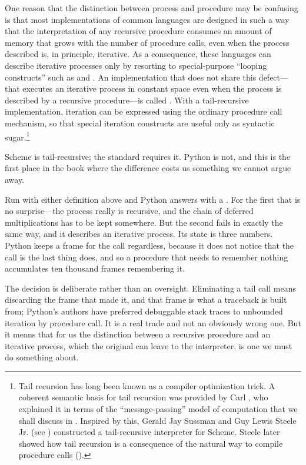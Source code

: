 One reason that the distinction between process and procedure may be confusing
is that most implementations of common languages are designed in such a way
that the interpretation of any recursive procedure consumes an amount of memory
that grows with the number of procedure calls, even when the process described
is, in principle, iterative.  As a consequence, these languages can describe
iterative processes only by resorting to special-purpose ``looping constructs''
such as  and .  An implementation that does not share
this defect---that executes an iterative process in constant space even when
the process is described by a recursive procedure---is called
.  With a tail-recursive implementation, iteration can
be expressed using the ordinary procedure call mechanism, so that special
iteration constructs are useful only as syntactic sugar.\footnote{Tail
recursion has long been known as a compiler optimization trick.  A coherent
semantic basis for tail recursion was provided by Carl ,
who explained it in terms of the ``message-passing'' model of computation that
we shall discuss in .  Inspired by this, Gerald Jay Sussman and
Guy Lewis Steele Jr. (see ) constructed a
tail-recursive interpreter for Scheme.  Steele later showed how tail recursion
is a consequence of the natural way to compile procedure calls
().}

\begin{departure}
Scheme is tail-recursive; the standard requires it.  Python is not, and this is
the first place in the book where the difference costs us something we cannot
argue away.

Run  with either definition above and Python answers
with a .  For the first that is no surprise---the process
really is recursive, and the chain of deferred multiplications has to be kept
somewhere.  But the second fails in exactly the same way, and it describes an
iterative process.  Its state is three numbers.  Python keeps a frame for the
call regardless, because it does not notice that the call is the last thing
 does, and so a procedure that needs to remember nothing
accumulates ten thousand frames remembering it.

The decision is deliberate rather than an oversight.  Eliminating a tail call
means discarding the frame that made it, and that frame is what a traceback is
built from; Python's authors have preferred debuggable stack traces to
unbounded iteration by procedure call.  It is a real trade and not an obviously
wrong one.  But it means that for us the distinction between a recursive
procedure and an iterative process, which the original can leave to the
interpreter, is one we must do something about.
\end{departure}

